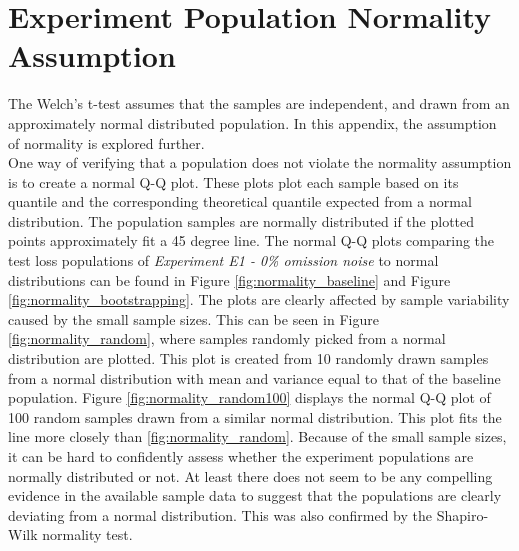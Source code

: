 \section{Experiment Population Normality Assumption}
\label{app:normality}
The Welch's t-test assumes that the samples are independent, and drawn from an approximately normal distributed population. In this appendix, the assumption of normality is explored further.\\

One way of verifying that a population does not violate the normality assumption is to create a normal Q-Q plot. These plots plot each sample based on its quantile and the corresponding theoretical quantile expected from a normal distribution. The population samples are normally distributed if the plotted points approximately fit a 45 degree line. The normal Q-Q plots comparing the test loss populations of {\it Experiment E1 - 0\% omission noise} to normal distributions can be found in Figure \ref{fig:normality_baseline} and Figure \ref{fig:normality_bootstrapping}. The plots are clearly affected by sample variability caused by the small sample sizes. This can be seen in Figure \ref{fig:normality_random}, where samples randomly picked from a normal distribution are plotted.  This plot is created from 10 randomly drawn samples from a normal distribution with mean and variance equal to that of the baseline population. Figure \ref{fig:normality_random100} displays the normal Q-Q plot of 100 random samples drawn from a similar normal distribution. This plot fits the line more closely than \ref{fig:normality_random}. Because of the small sample sizes, it can be hard to confidently assess whether the experiment populations are normally distributed or not. At least there does not seem to be any compelling evidence in the available sample data to suggest that the populations are clearly deviating from a normal distribution. This was also confirmed by the Shapiro-Wilk normality test.\\

